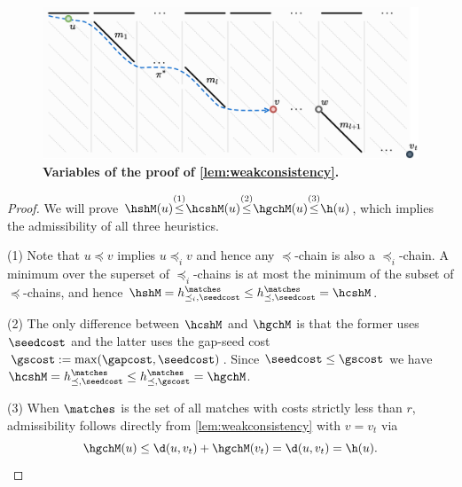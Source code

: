 \begin{figure}[t]
    \centering
    \includegraphics[width=\linewidth]{imgs/proofs/recursive-h.pdf}%
    \caption{\textbf{Variables of the proof of \cref{lem:weakconsistency}.}}
    \label{fig:recursive-h}
\end{figure}

\thmadmissible*
\begin{proof}
  We will prove $\hshM(u) {\overset{(1)}{\leq}} \hcshM(u) {\overset{(2)}{\leq}}
  \hgchM(u) {\overset{(3)}{\leq}} \h(u)$, which implies the admissibility of
  all three heuristics.

  (1) Note that $u\preceq v$ implies $u\preceq_i v$ and hence any
  $\preceq$-chain is also a $\preceq_i$-chain. A minimum over the superset of
  $\preceq_i$-chains is at most the minimum of the subset of $\preceq$-chains,
  and hence $\hshM = h^{\matches}_{\preceq_i, \seedcost} \leq
  h^{\matches}_{\preceq, \seedcost} = \hcshM$.
  
  (2) The only difference between $\hcshM$ and $\hgchM$ is that the
  former uses $\seedcost$ and the latter uses the gap-seed cost $\gscost :=
  \max(\gapcost, \seedcost)$. Since $\seedcost \leq \gscost$ we have $\hcshM =
  h^{\matches}_{\preceq, \seedcost} \leq h^{\matches}_{\preceq, \gscost} =
  \hgchM$.

  (3)
  When $\matches$ is the set of all matches with costs strictly less than $r$,
  admissibility follows directly from \cref{lem:weakconsistency} with $v = v_t$
  via
  \begin{equation*}
  \hgchM(u) \leq \d(u, v_t) + \hgchM(v_t) = \d(u, v_t) = \h(u).\qedhere
  \end{equation*}
\end{proof}
